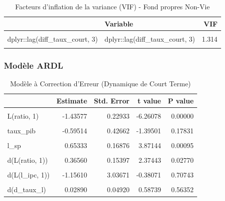 \documentclass[
]{article}
\begin{document}
\begin{longtable}[t]{llr}
\caption{\label{tab:unnamed-chunk-55}Facteurs d'inflation de la variance (VIF) - Fond propres Non-Vie}\\
\toprule
 & Variable & VIF\\
\midrule
\cellcolor{gray!10}{dplyr::lag(diff\_ratio, 1)} & \cellcolor{gray!10}{dplyr::lag(diff\_ratio, 1)} & \cellcolor{gray!10}{1.083}\\
dplyr::lag(diff\_taux\_court, 3) & dplyr::lag(diff\_taux\_court, 3) & 1.314\\
\cellcolor{gray!10}{dplyr::lag(diff\_taux\_long, 3)} & \cellcolor{gray!10}{dplyr::lag(diff\_taux\_long, 3)} & \cellcolor{gray!10}{1.321}\\
\bottomrule
\end{longtable}

\subsubsection{Modèle ARDL}\label{moduxe8le-ardl-1}

\begin{longtable}[t]{lrrrr}
\caption{\label{tab:unnamed-chunk-56}Modèle à Correction d'Erreur (Dynamique de Court Terme)}\\
\toprule
 & Estimate & Std. Error & t value & P value\\
\midrule
\cellcolor{gray!10}{(Intercept)} & \cellcolor{gray!10}{5.98835} & \cellcolor{gray!10}{1.65040} & \cellcolor{gray!10}{3.62843} & \cellcolor{gray!10}{0.00167}\\
L(ratio, 1) & -1.43577 & 0.22933 & -6.26078 & 0.00000\\
\cellcolor{gray!10}{L(l\_ipc, 1)} & \cellcolor{gray!10}{-0.71122} & \cellcolor{gray!10}{0.51071} & \cellcolor{gray!10}{-1.39260} & \cellcolor{gray!10}{0.17903}\\
taux\_pib & -0.59514 & 0.42662 & -1.39501 & 0.17831\\
\cellcolor{gray!10}{L(d\_taux\_l, 1)} & \cellcolor{gray!10}{0.11224} & \cellcolor{gray!10}{0.06702} & \cellcolor{gray!10}{1.67463} & \cellcolor{gray!10}{0.10957}\\
\addlinespace
l\_sp & 0.65333 & 0.16876 & 3.87144 & 0.00095\\
\cellcolor{gray!10}{l\_cac} & \cellcolor{gray!10}{-0.55268} & \cellcolor{gray!10}{0.26657} & \cellcolor{gray!10}{-2.07330} & \cellcolor{gray!10}{0.05128}\\
d(L(ratio, 1)) & 0.36560 & 0.15397 & 2.37443 & 0.02770\\
\cellcolor{gray!10}{d(l\_ipc)} & \cellcolor{gray!10}{6.96610} & \cellcolor{gray!10}{3.24159} & \cellcolor{gray!10}{2.14898} & \cellcolor{gray!10}{0.04406}\\
d(L(l\_ipc, 1)) & -1.15610 & 3.03671 & -0.38071 & 0.70743\\
\addlinespace
\cellcolor{gray!10}{d(L(l\_ipc, 2))} & \cellcolor{gray!10}{13.40692} & \cellcolor{gray!10}{3.48527} & \cellcolor{gray!10}{3.84673} & \cellcolor{gray!10}{0.00101}\\
d(d\_taux\_l) & 0.02890 & 0.04920 & 0.58739 & 0.56352\\
\bottomrule
\end{longtable}
\end{document}
